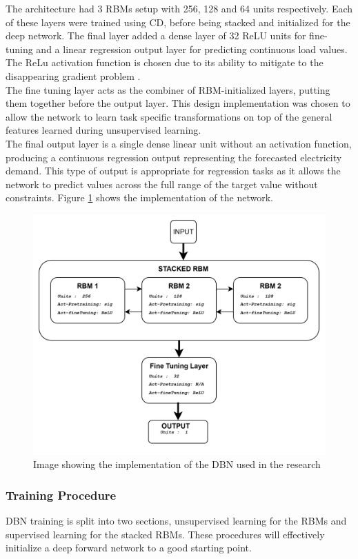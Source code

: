 The architecture had 3 RBMs setup with 256, 128 and 64 units respectively. Each of these layers were trained using CD, before being stacked and initialized for the deep network. The final layer added a dense layer of 32 ReLU units for fine-tuning and a linear regression output layer for predicting continuous load values. The ReLu activation function is chosen due to its ability to mitigate to the disappearing gradient problem \cite{dong2017short}.\\
 The fine tuning layer acts as the combiner of RBM-initialized layers, putting them together before the output layer. This design implementation was chosen to allow the network to learn task specific transformations on top of the general features learned during unsupervised learning.\\
 The final output layer is a single dense linear unit without an activation function, producing a continuous regression output representing the forecasted electricity demand. This type of output is appropriate for regression tasks as it allows the network to predict values across the full range of the target value without constraints. Figure \ref{fig:dbnimplementation} shows the implementation of the network.
\begin{figure}[H]
	\centering
	\includegraphics[width=0.7\linewidth]{Chapters/images/DBN_IMPLEMENTATION}
	\caption{Image showing the implementation of the DBN used in the research}
	\label{fig:dbnimplementation}
\end{figure}


\subsubsection{Training Procedure}
 DBN training is split into two sections, unsupervised learning for the RBMs and supervised learning for the stacked RBMs. These procedures will effectively initialize a deep forward network to a good starting point.
 
